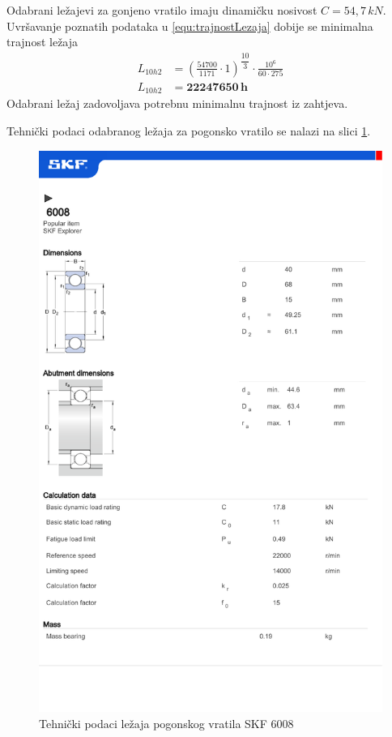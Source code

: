 \documentclass[11pt,a4paper]{report}
\begin{document}
Odabrani ležajevi za gonjeno vratilo imaju dinamičku nosivost $C=54,7 \,kN$.
Uvršavanje poznatih podataka u \eqref{equ:trajnostLezaja} dobije se minimalna trajnost ležaja
\begin{align*}
L_{10h2}&=\left(\frac{54700}{1171} \cdot 1 \right)^{\dfrac{10}{3}} \cdot \frac{10^6}{60 \cdot 275}\\
L_{10h2}&=\mathbf{22247650\, h}
\end{align*}
Odabrani ležaj zadovoljava potrebnu minimalnu trajnost iz zahtjeva.

Tehnički podaci odabranog ležaja za pogonsko vratilo se nalazi na slici \ref{fig:lezajPogonskogVratila}.
\begin{figure}
\includegraphics[width=1\textwidth]{datasheetsModels/Deep_groove_ball_bearings-6008.pdf}
\caption{Tehnički podaci ležaja pogonskog vratila SKF 6008}\label{fig:lezajPogonskogVratila}
\end{figure} 
\end{document}
